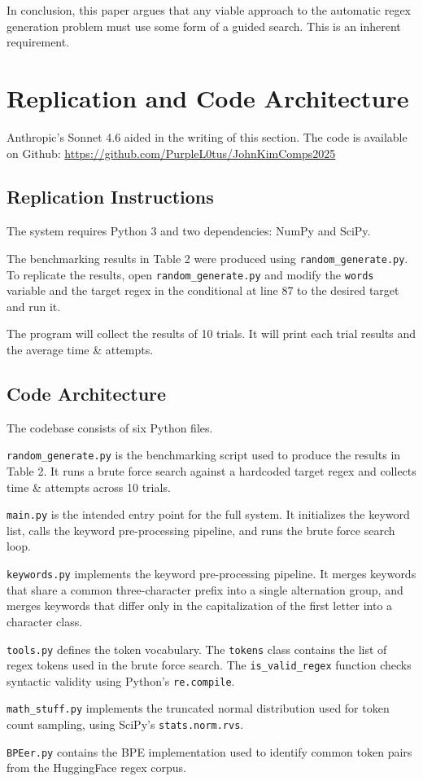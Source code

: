 \documentclass[10pt,twocolumn]{article}
\begin{document}
In conclusion, this paper argues that any viable approach to the automatic regex generation problem must use some form of a guided search. This is an inherent requirement. 

\appendix
\section{Replication and Code Architecture}

Anthropic's Sonnet 4.6 aided in the writing of this section. The code is available on Github: \url{https://github.com/PurpleL0tus/JohnKimComps2025}

\subsection{Replication Instructions}

The system requires Python 3 and two dependencies: NumPy and SciPy. 

The benchmarking results in Table 2 were produced using \verb|random_generate.py|. To replicate the results, open \verb|random_generate.py| and modify the \verb|words| variable and the target regex in the conditional at line 87 to the desired target and run it.

The program will collect the results of 10 trials. It will print each trial results and the average time \& attempts.

\subsection{Code Architecture}

The codebase consists of six Python files.

\verb|random_generate.py| is the benchmarking script used to produce the results in Table 2. It runs a brute force search against a hardcoded target regex and collects time \& attempts across 10 trials.

\verb|main.py| is the intended entry point for the full system. It initializes the keyword list, calls the keyword pre-processing pipeline, and runs the brute force search loop.

\verb|keywords.py| implements the keyword pre-processing pipeline. It merges keywords that share a common three-character prefix into a single alternation group, and merges keywords that differ only in the capitalization of the first letter into a character class.

\verb|tools.py| defines the token vocabulary. The \verb|tokens| class contains the list of regex tokens used in the brute force search. The \verb|is_valid_regex| function checks syntactic validity using Python's \verb|re.compile|.

\verb|math_stuff.py| implements the truncated normal distribution used for token count sampling, using SciPy's \verb|stats.norm.rvs|.

\verb|BPEer.py| contains the BPE implementation used to identify common token pairs from the HuggingFace regex corpus.

\printbibliography

\clearpage

\onecolumn
\end{document}
